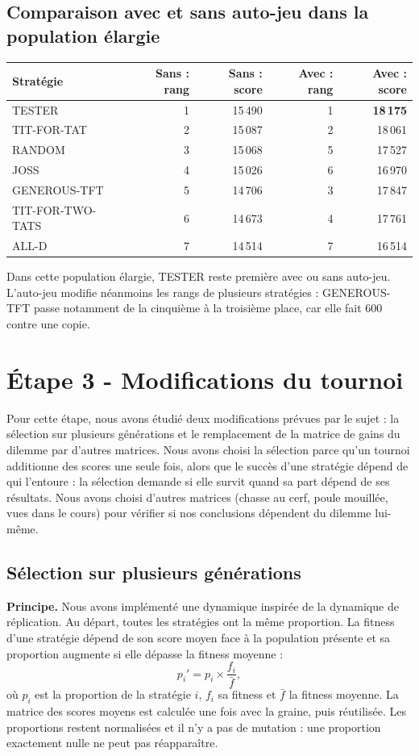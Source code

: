 \documentclass[10pt,a4paper]{article}
\begin{document}
\subsection{Comparaison avec et sans auto-jeu dans la population élargie}
\begin{center}
\small
\begin{tabular}{@{}lrrrr@{}}
\toprule
Stratégie & Sans : rang & Sans : score & Avec : rang & Avec : score \\
\midrule
TESTER & 1 & 15\,490 & 1 & \textbf{18\,175} \\
TIT-FOR-TAT & 2 & 15\,087 & 2 & 18\,061 \\
RANDOM & 3 & 15\,068 & 5 & 17\,527 \\
JOSS & 4 & 15\,026 & 6 & 16\,970 \\
GENEROUS-TFT & 5 & 14\,706 & 3 & 17\,847 \\
TIT-FOR-TWO-TATS & 6 & 14\,673 & 4 & 17\,761 \\
ALL-D & 7 & 14\,514 & 7 & 16\,514 \\
\bottomrule
\end{tabular}
\end{center}
Dans cette population élargie, TESTER reste première avec ou sans auto-jeu. L'auto-jeu modifie néanmoins les rangs de plusieurs
stratégies : GENEROUS-TFT passe notamment de la cinquième à la troisième place, car elle fait 600 contre une copie.

\section{Étape 3 - Modifications du tournoi}
Pour cette étape, nous avons étudié deux modifications prévues par le sujet : la sélection sur plusieurs générations et le
remplacement de la matrice de gains du dilemme par d'autres matrices. Nous avons choisi la sélection parce qu'un tournoi
additionne des scores une seule fois, alors que le succès d'une stratégie dépend de qui l'entoure : la sélection demande si
elle survit quand sa part dépend de ses résultats. Nous avons choisi d'autres matrices (chasse au cerf, poule mouillée, vues dans
le cours) pour vérifier si nos conclusions dépendent du dilemme lui-même.

\subsection{Sélection sur plusieurs générations}
\textbf{Principe.} Nous avons implémenté une dynamique inspirée de la dynamique de réplication. Au départ, toutes les
stratégies ont la même proportion. La fitness d'une stratégie dépend de son score moyen face à la population présente et
sa proportion augmente si elle dépasse la fitness moyenne :
\[
p_i' = p_i \times \frac{f_i}{\bar f},
\]
où \(p_i\) est la proportion de la stratégie \(i\), \(f_i\) sa fitness et \(\bar f\) la fitness moyenne. La matrice des scores
moyens est calculée une fois avec la graine, puis réutilisée. Les proportions restent normalisées et il n'y a pas de mutation :
une proportion exactement nulle ne peut pas réapparaître.
\end{document}
